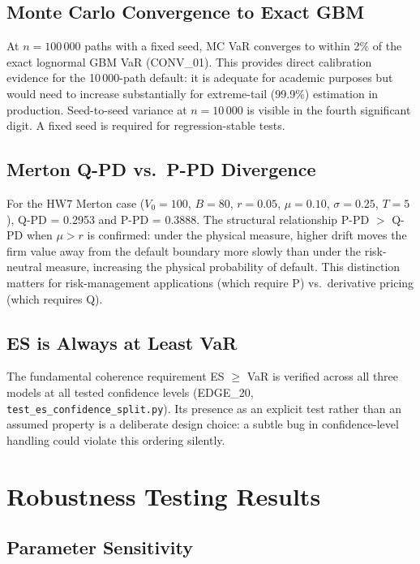 \documentclass[11pt]{article}
\newcommand{\code}[1]{\texttt{#1}}
\begin{document}
\subsection{Monte Carlo Convergence to Exact GBM}

At $n = 100\,000$ paths with a fixed seed, MC VaR converges to within 2\%
of the exact lognormal GBM VaR (CONV\_01).  This provides direct calibration
evidence for the 10\,000-path default: it is adequate for academic purposes
but would need to increase substantially for extreme-tail (99.9\%) estimation
in production.  Seed-to-seed variance at $n = 10\,000$ is visible in the
fourth significant digit. A fixed seed is required for regression-stable
tests.

\subsection{Merton Q-PD vs.\ P-PD Divergence}

For the HW7 Merton case ($V_0 = 100$, $B = 80$, $r = 0.05$, $\mu = 0.10$,
$\sigma = 0.25$, $T = 5$), Q-PD = 0.2953 and P-PD = 0.3888.  The
structural relationship P-PD $>$ Q-PD when $\mu > r$ is confirmed: under
the physical measure, higher drift moves the firm value away from the
default boundary more slowly than under the risk-neutral measure, increasing
the physical probability of default.  This distinction matters for
risk-management applications (which require P) vs.\ derivative pricing
(which requires Q).

\subsection{ES is Always at Least VaR}

The fundamental coherence requirement ES $\geq$ VaR is verified across all
three models at all tested confidence levels (EDGE\_20,
\code{test\_es\_confidence\_split.py}).  Its presence as an explicit test
rather than an assumed property is a deliberate design choice: a subtle
bug in confidence-level handling could violate this ordering silently.

\section{Robustness Testing Results}

\subsection{Parameter Sensitivity}
\end{document}
